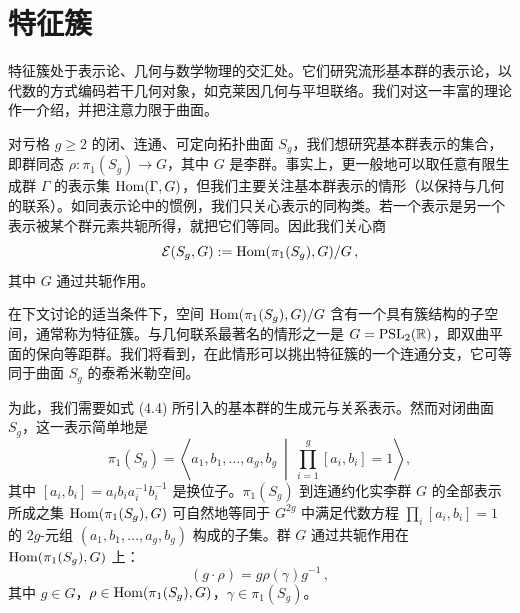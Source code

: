 
\section{特征簇}

特征簇处于表示论、几何与数学物理的交汇处。它们研究流形基本群的表示论，以代数的方式编码若干几何对象，如克莱因几何与平坦联络。我们对这一丰富的理论作一介绍，并把注意力限于曲面。

对亏格 $g\ge 2$ 的闭、连通、可定向拓扑曲面 $S_g$，我们想研究基本群表示的集合，即群同态 $\rho:\pi_1(S_g)\to G$，其中 $G$ 是李群。事实上，更一般地可以取任意有限生成群 $\Gamma$ 的表示集 $\operatorname{Hom}(\Gamma,G)$，但我们主要关注基本群表示的情形（以保持与几何的联系）。如同表示论中的惯例，我们只关心表示的同构类。若一个表示是另一个表示被某个群元素共轭所得，就把它们等同。因此我们关心商
\[
\mathcal{E}(S_g,G):=\operatorname{Hom}(\pi_1(S_g),G)/G\,,
\]
其中 $G$ 通过共轭作用。

在下文讨论的适当条件下，空间 $\operatorname{Hom}(\pi_1(S_g),G)/G$ 含有一个具有簇结构的子空间，通常称为特征簇。与几何联系最著名的情形之一是 $G=\operatorname{PSL}_2(\mathbb{R})$，即双曲平面的保向等距群。我们将看到，在此情形可以挑出特征簇的一个连通分支，它可等同于曲面 $S_g$ 的泰希米勒空间。

为此，我们需要如式 (4.4) 所引入的基本群的生成元与关系表示。然而对闭曲面 $S_g$，这一表示简单地是
\begin{equation}
\pi_1(S_g)=\left\langle a_1,b_1,\dots,a_g,b_g\ \middle|\ \prod_{i=1}^{g}[a_i,b_i]=1\right\rangle,
\tag{9.1}
\end{equation}
其中 $[a_i,b_i]=a_ib_ia_i^{-1}b_i^{-1}$ 是换位子。$\pi_1(S_g)$ 到连通约化实李群 $G$ 的全部表示所成之集 $\operatorname{Hom}(\pi_1(S_g),G)$ 可自然地等同于 $G^{2g}$ 中满足代数方程 $\prod_i[a_i,b_i]=1$ 的 $2g$-元组 $(a_1,b_1,\dots,a_g,b_g)$ 构成的子集。群 $G$ 通过共轭作用在 $\operatorname{Hom}(\pi_1(S_g),G)$ 上：
\[
(g\cdot\rho)=g\rho(\gamma)g^{-1}\,,
\]
其中 $g\in G$，$\rho\in\operatorname{Hom}(\pi_1(S_g),G)$，$\gamma\in\pi_1(S_g)$。


